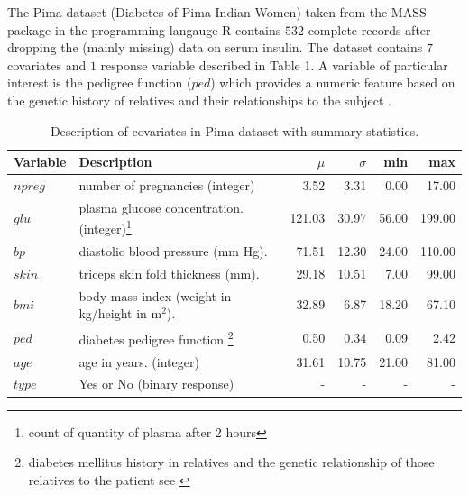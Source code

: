 \documentclass[11pt,letterpaper]{article}
\begin{document}
The Pima dataset (Diabetes of Pima Indian Women) taken from the MASS package \citep{pima_d}
in the programming langauge R \citep{Rprog} contains $ 532$ complete records after dropping the (mainly missing) data on serum insulin.  The dataset contains $7$ covariates and $1$ response variable described in Table 1. A variable of particular interest is the pedigree function ($ped$) which provides a numeric feature based on the genetic history of relatives and their relationships to the subject \citep{pima}.


\begin{table}[!h]
\label{covDes}
\caption{Description of covariates in Pima dataset with summary statistics.}
\centering
\begin{minipage}{\textwidth}
\begin{tabular}{|llrrrr|}
\hline
Variable & Description & $\mu$ & $\sigma$ & min & max \\ 
\hline
$npreg$      & number of pregnancies (integer)                                                                                     & 3.52   & 3.31  & 0.00  & 17.00  \\
$glu$   & plasma glucose concentration. (integer)\footnote{count of quantity of plasma after 2 hours} & 121.03 & 30.97 & 56.00 & 199.00 \\
$bp$         & diastolic blood pressure (mm Hg).                                                                                   & 71.51  & 12.30 & 24.00 & 110.00 \\
$skin $      & triceps skin fold thickness (mm).                                                                                   & 29.18  & 10.51 & 7.00  & 99.00  \\
$bmi $       & body mass index (weight in kg/height in m$^2$).                                    & 32.89  & 6.87  & 18.20 & 67.10  \\
$ped$        & diabetes pedigree function \footnote{diabetes mellitus history in relatives and the genetic relationship of those relatives to the patient see \cite{pima} }                                                                               & 0.50   & 0.34  & 0.09  & 2.42   \\
$age$        & age in years. (integer)                                                                                             & 31.61  & 10.75 & 21.00 & 81.00  \\
\hline
$type $      & Yes or No (binary response)                                                & -      & -     & -     & -     \\
\hline
\end{tabular}
\end{minipage}
\end{table}
\end{document}
